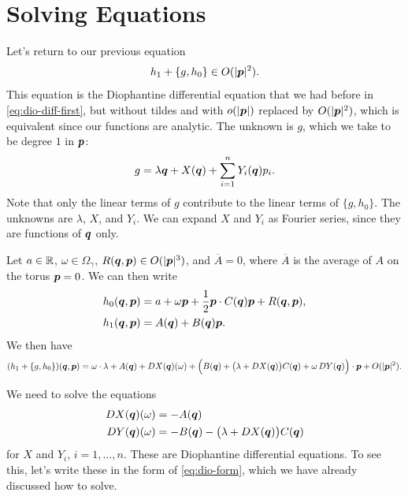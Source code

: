 \documentclass[twoside,letterpaper,11pt]{article}
\numberwithin{equation}{section}
\begin{document}
\section{Solving Equations}
\label{sec:solving-equations}

Let's return to our previous equation
\begin{equation*}
  h_1 + \{g, h_0\} \in O(|\bm{p}|^2).
\end{equation*}
This equation is the Diophantine differential equation that we had before in
\cref{eq:dio-diff-first}, but without tildes and with $o(|\bm{p}|)$ replaced by
$O(|\bm{p}|^2)$, which is equivalent since our functions are analytic.
The unknown is $g$, which we take to be degree $1$ in $\bm{p}$:
\begin{equation*}
  g = \lambda \bm{q} + X(\bm{q}) + \sum_{i=1}^n Y_i(\bm{q}) p_i.
\end{equation*}
Note that only the linear terms of $g$ contribute to the linear terms of $\{g,
h_0\}$.
The unknowns are $\lambda$, $X$, and $Y_i$.
We can expand $X$ and $Y_i$ as Fourier series, since they are functions of
$\bm{q}$ only.

Let $a \in \mathbb{R}$, $\omega \in \Omega_{\gamma}$, $R(\bm{q}, \bm{p}) \in
O(|\bm{p}|^3)$, and $\overline{A} = 0$, where $\overline{A}$ is the average of
$A$ on the torus $\bm{p} = 0$.
We can then write
\begin{align*}
  h_0(\bm{q}, \bm{p}) &= a + \omega \bm{p} + \frac{1}{2} \bm{p} \cdot C(\bm{q})
                        \bm{p} + R(\bm{q}, \bm{p}),\\
  h_1(\bm{q}, \bm{p}) &= A(\bm{q}) + B(\bm{q}) \bm{p}.
\end{align*}
We then have
\begin{equation*}
  (h_1 + \{g, h_0\}) (\bm{q}, \bm{p}) = \omega \cdot \lambda + A(\bm{q}) + \mathop{}\!D
  X(\bm{q}) (\omega) + \Big( B(\bm{q}) + \big(\lambda + \mathop{}\!D X(\bm{q}) \big)
  C(\bm{q}) + \omega \mathop{}\!D Y(\bm{q}) \Big) \cdot \bm{p} + O(|\bm{p}|^2).
\end{equation*}

We need to solve the equations
\begin{align}
  \label{eq:fst-to-solve}
  \mathop{}\!D X(\bm{q}) (\omega) &= - A(\bm{q})\\
  \label{eq:snd-to-solve}
  \mathop{}\!D Y(\bm{q}) (\omega) &= -B(\bm{q}) - \big(\lambda + \mathop{}\!D
     X(\bm{q})\big)C(\bm{q})
\end{align}
for $X$ and $Y_i$, $i = 1, \ldots, n$.
These are Diophantine differential equations.
To see this, let's write these in the form of \cref{eq:dio-form}, which we have
already discussed how to solve.
\end{document}
